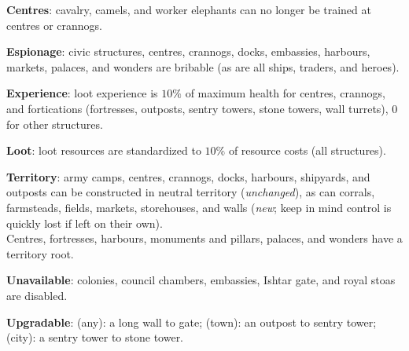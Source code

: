 \documentclass{article}
\begin{document}
\textbf{Centres}: cavalry, camels, and worker elephants can no longer be trained at centres or crannogs.

\textbf{Espionage}: civic structures, centres, crannogs, docks, embassies, harbours, markets, palaces, and wonders are bribable (as are all ships, traders, and heroes).

\textbf{Experience}: loot experience is $10\%$ of maximum health for centres, crannogs, and fortications (fortresses, outposts, sentry towers, stone towers, wall turrets), $0$ for other structures.

\textbf{Loot}: loot resources are standardized to $10\%$ of resource costs (all structures).

\textbf{Territory}: army camps, centres, crannogs, docks, harbours, shipyards, and outposts can be constructed in neutral territory (\emph{unchanged}), as can corrals, farmsteads, fields, markets, storehouses, and walls (\emph{new}; keep in mind control is quickly lost if left on their own).\\
Centres, fortresses, harbours, monuments and pillars, palaces, and wonders have a territory root.

\textbf{Unavailable}: colonies, council chambers, embassies, Ishtar gate, and royal stoas are disabled.

\textbf{Upgradable}: (any): a long wall to gate; (town): an outpost to sentry tower; (city): a sentry tower to stone tower.
\end{document}
